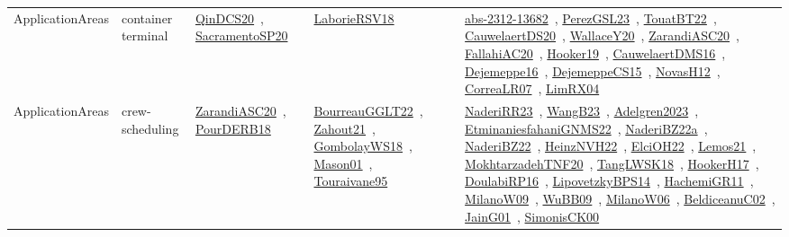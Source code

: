 {\begin{longtable}{lp{3cm}>{\raggedright\arraybackslash}p{6cm}>{\raggedright\arraybackslash}p{6cm}>{\raggedright\arraybackslash}p{8cm}}
ApplicationAreas & container terminal & \href{works/QinDCS20.pdf}{QinDCS20}~\cite{QinDCS20}, \href{works/SacramentoSP20.pdf}{SacramentoSP20}~\cite{SacramentoSP20} & \href{works/LaborieRSV18.pdf}{LaborieRSV18}~\cite{LaborieRSV18} & \href{works/abs-2312-13682.pdf}{abs-2312-13682}~\cite{abs-2312-13682}, \href{works/PerezGSL23.pdf}{PerezGSL23}~\cite{PerezGSL23}, \href{works/TouatBT22.pdf}{TouatBT22}~\cite{TouatBT22}, \href{works/CauwelaertDS20.pdf}{CauwelaertDS20}~\cite{CauwelaertDS20}, \href{works/WallaceY20.pdf}{WallaceY20}~\cite{WallaceY20}, \href{works/ZarandiASC20.pdf}{ZarandiASC20}~\cite{ZarandiASC20}, \href{works/FallahiAC20.pdf}{FallahiAC20}~\cite{FallahiAC20}, \href{works/Hooker19.pdf}{Hooker19}~\cite{Hooker19}, \href{works/CauwelaertDMS16.pdf}{CauwelaertDMS16}~\cite{CauwelaertDMS16}, \href{works/Dejemeppe16.pdf}{Dejemeppe16}~\cite{Dejemeppe16}, \href{works/DejemeppeCS15.pdf}{DejemeppeCS15}~\cite{DejemeppeCS15}, \href{works/NovasH12.pdf}{NovasH12}~\cite{NovasH12}, \href{works/CorreaLR07.pdf}{CorreaLR07}~\cite{CorreaLR07}, \href{works/LimRX04.pdf}{LimRX04}~\cite{LimRX04}\\
ApplicationAreas & crew-scheduling & \href{works/ZarandiASC20.pdf}{ZarandiASC20}~\cite{ZarandiASC20}, \href{works/PourDERB18.pdf}{PourDERB18}~\cite{PourDERB18} & \href{works/BourreauGGLT22.pdf}{BourreauGGLT22}~\cite{BourreauGGLT22}, \href{works/Zahout21.pdf}{Zahout21}~\cite{Zahout21}, \href{works/GombolayWS18.pdf}{GombolayWS18}~\cite{GombolayWS18}, \href{works/Mason01.pdf}{Mason01}~\cite{Mason01}, \href{works/Touraivane95.pdf}{Touraivane95}~\cite{Touraivane95} & \href{works/NaderiRR23.pdf}{NaderiRR23}~\cite{NaderiRR23}, \href{works/WangB23.pdf}{WangB23}~\cite{WangB23}, \href{works/Adelgren2023.pdf}{Adelgren2023}~\cite{Adelgren2023}, \href{works/EtminaniesfahaniGNMS22.pdf}{EtminaniesfahaniGNMS22}~\cite{EtminaniesfahaniGNMS22}, \href{works/NaderiBZ22a.pdf}{NaderiBZ22a}~\cite{NaderiBZ22a}, \href{works/NaderiBZ22.pdf}{NaderiBZ22}~\cite{NaderiBZ22}, \href{works/HeinzNVH22.pdf}{HeinzNVH22}~\cite{HeinzNVH22}, \href{works/ElciOH22.pdf}{ElciOH22}~\cite{ElciOH22}, \href{works/Lemos21.pdf}{Lemos21}~\cite{Lemos21}, \href{works/MokhtarzadehTNF20.pdf}{MokhtarzadehTNF20}~\cite{MokhtarzadehTNF20}, \href{works/TangLWSK18.pdf}{TangLWSK18}~\cite{TangLWSK18}, \href{works/HookerH17.pdf}{HookerH17}~\cite{HookerH17}, \href{works/DoulabiRP16.pdf}{DoulabiRP16}~\cite{DoulabiRP16}, \href{works/LipovetzkyBPS14.pdf}{LipovetzkyBPS14}~\cite{LipovetzkyBPS14}, \href{works/HachemiGR11.pdf}{HachemiGR11}~\cite{HachemiGR11}, \href{works/MilanoW09.pdf}{MilanoW09}~\cite{MilanoW09}, \href{works/WuBB09.pdf}{WuBB09}~\cite{WuBB09}, \href{works/MilanoW06.pdf}{MilanoW06}~\cite{MilanoW06}, \href{works/BeldiceanuC02.pdf}{BeldiceanuC02}~\cite{BeldiceanuC02}, \href{works/JainG01.pdf}{JainG01}~\cite{JainG01}, \href{works/SimonisCK00.pdf}{SimonisCK00}~\cite{SimonisCK00}\\

\end{longtable}}
